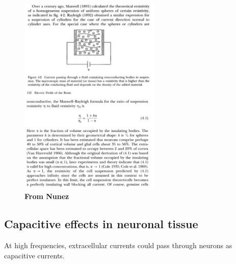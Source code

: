 \begin{figure}[!ht]
\begin{center}
\includegraphics[width=0.6\textwidth]{Figures/resistivity_maxwell.png}
\end{center}
\caption{\textbf{From Nunez} }
\label{fig:maxwell_resistivity}
\end{figure}

\subsection{Capacitive effects in neuronal tissue}
At high frequencies, extracellular currents could pass through neurons as capacitive currents.
